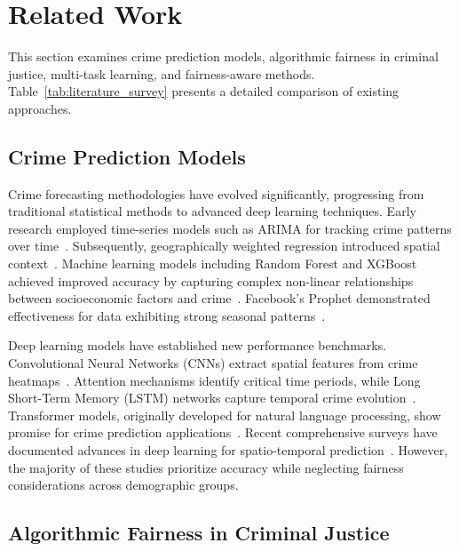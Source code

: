 \documentclass[conference]{IEEEtran}
\begin{document}
\section{Related Work}

This section examines crime prediction models, algorithmic fairness in criminal justice, multi-task learning, and fairness-aware methods. Table~\ref{tab:literature_survey} presents a detailed comparison of existing approaches.

\subsection{Crime Prediction Models}

Crime forecasting methodologies have evolved significantly, progressing from traditional statistical methods to advanced deep learning techniques. Early research employed time-series models such as ARIMA for tracking crime patterns over time~\cite{box2015time}. Subsequently, geographically weighted regression introduced spatial context~\cite{anselin2000spatial}. Machine learning models including Random Forest and XGBoost achieved improved accuracy by capturing complex non-linear relationships between socioeconomic factors and crime~\cite{breiman2001random, chen2016xgboost}. Facebook's Prophet demonstrated effectiveness for data exhibiting strong seasonal patterns~\cite{taylor2018forecasting}.

Deep learning models have established new performance benchmarks. Convolutional Neural Networks (CNNs) extract spatial features from crime heatmaps~\cite{huang2018deepcrime}. Attention mechanisms identify critical time periods, while Long Short-Term Memory (LSTM) networks capture temporal crime evolution~\cite{hochreiter1997long}. Transformer models, originally developed for natural language processing, show promise for crime prediction applications~\cite{vaswani2017attention}. Recent comprehensive surveys have documented advances in deep learning for spatio-temporal prediction~\cite{zhang2024deep, singh2022deep}. However, the majority of these studies prioritize accuracy while neglecting fairness considerations across demographic groups.

\subsection{Algorithmic Fairness in Criminal Justice}
\end{document}
